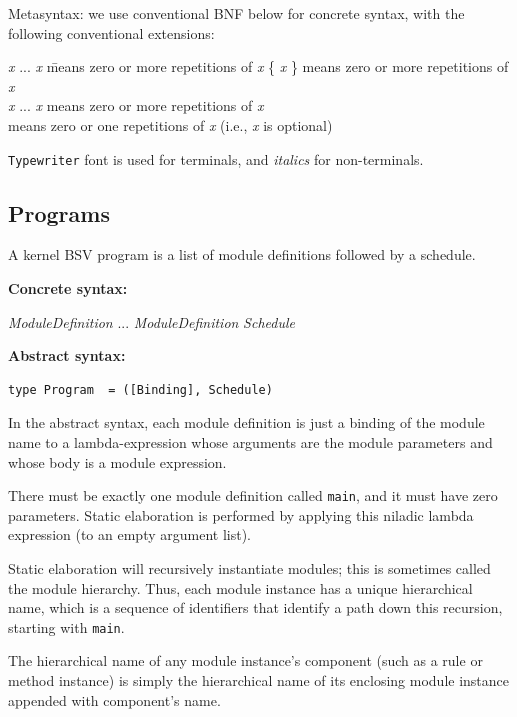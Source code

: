 \documentclass[11pt]{article}
\newcommand{\hm}{\hspace*{1em}}
\newcommand{\hmm}{\hspace*{2em}}
\newcommand{\nterm}[1]{\emph{#1}}
\newcommand{\term}[1]{\texttt{#1}}
\newcommand{\many}[2]{#1 #2 ... #2 #1}
\newcommand{\gram}[2]{    \hm\makebox[10em][l]{\it #1}\makebox[1.5em][l]{::=}    #2}
\begin{document}
Metasyntax: we use conventional BNF below for concrete syntax, with
the following conventional extensions:
\begin{tabbing}
\hmm \= \emph{x} ... \emph{x} \hm \= means zero or more repetitions of \emph{x} \kill
\hmm \> \{ \emph{x} \}            \> means zero or more repetitions of \emph{x} \\
\hmm \> \emph{x} ... \emph{x}     \> means zero or more repetitions of \emph{x} \\
\hmm \> [  \emph{x} ]             \> means zero or one repetitions of \emph{x} (i.e., \emph{x} is optional)
\end{tabbing}

\term{Typewriter} font is used for terminals, and \nterm{italics} for non-terminals.


\subsection{Programs}

A kernel BSV program is a list of module definitions followed by a
schedule.

{\bf Concrete syntax:}

\gram{Program}{\many{\nterm{ModuleDefinition}}{\hm} \nterm{Schedule}}

{\bf Abstract syntax:}

\begin{Verbatim}[frame=single, commandchars=\\\{\}]
type Program  = ([Binding], Schedule)
\end{Verbatim}

In the abstract syntax, each module definition is just a binding of
the module name to a lambda-expression whose arguments are the module
parameters and whose body is a module expression.

There must be exactly one module definition called \term{main}, and it
must have zero parameters.  Static elaboration is performed by
applying this niladic lambda expression (to an empty argument list).

Static elaboration will recursively instantiate modules; this is
sometimes called the module hierarchy.  Thus, each module instance has
a unique hierarchical name, which is a sequence of identifiers that
identify a path down this recursion, starting with \term{main}.

The hierarchical name of any module instance's component (such as a
rule or method instance) is simply the hierarchical name of its
enclosing module instance appended with component's name.
\end{document}
